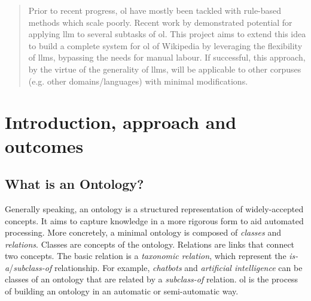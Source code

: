
\begin{abstract}
    \noindent Prior to recent progress, \gls{ol} have mostly been tackled with rule-based methods which scale poorly. Recent work by \citet{llms4ol} demonstrated potential for applying \gls{llm} to several subtasks of \gls{ol}. This project aims to extend this idea to build a complete system for \gls{ol} of Wikipedia by leveraging the flexibility of \gls{llm}s, bypassing the needs for manual labour. If successful, this approach, by the virtue of the generality of \gls{llm}s, will be applicable to other corpuses (e.g. other domains/languages) with minimal modifications.
\end{abstract}

\section*{Introduction, approach and outcomes}



\subsection*{What is an Ontology?}

Generally speaking, an ontology is a structured representation of widely-accepted concepts. It aims to capture knowledge in a more rigorous form to aid automated processing. More concretely, a minimal ontology is composed of \emph{classes} and \emph{relations}. Classes are concepts of the ontology. Relations are links that connect two concepts. The basic relation is a \emph{taxonomic relation}, which represent the \emph{is-a}/\emph{subclass-of} relationship. For example, \emph{chatbots} and \emph{artificial intelligence} can be classes of an ontology that are related by a \emph{subclass-of} relation. \gls{ol} is the process of building an ontology in an automatic or semi-automatic way.


